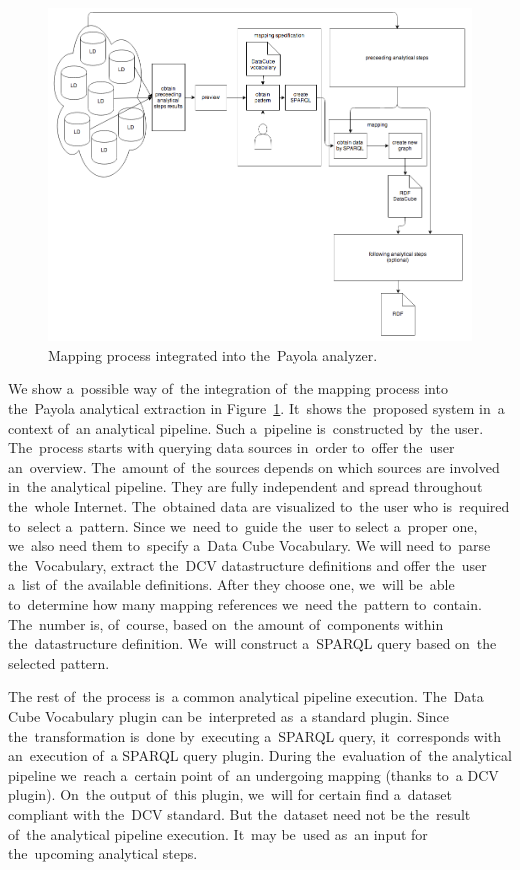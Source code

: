\begin{figure}
	\centering
	\includegraphics[width=140mm]{img/payola-mapping.png}
	\caption{Mapping process integrated into the~Payola analyzer.}
	\label{fig:payola-mapping}
\end{figure}

We show a~possible way of~the integration of~the mapping process into the~Payola analytical extraction
in Figure~\ref{fig:payola-mapping}. It~shows the~proposed system in~a context of~an
analytical pipeline. Such a~pipeline is~constructed by~the user. The~process starts with querying data 
sources in~order to~offer the~user an~overview. The~amount of~the sources depends 
on which sources are involved in~the analytical pipeline. They are fully independent 
and spread throughout the~whole Internet. The~obtained data are visualized to~the user who is~required to~select a~pattern. Since we~need to~guide the~user 
to select a~proper one, we~also need them to~specify a~Data Cube Vocabulary. 
We will need to~parse the~Vocabulary, extract the~DCV datastructure definitions 
and offer the~user a~list of~the available definitions. After they choose one, we~will be~able to~determine how many mapping references we~need the~pattern to~contain. The~number is, of~course, based on~the amount of~components 
within the~datastructure definition. We~will construct a~SPARQL query based on~the selected pattern.

The rest of~the process is~a common analytical pipeline execution. The~Data Cube 
Vocabulary plugin can be~interpreted as~a standard plugin. Since the~transformation is~done by~executing a~SPARQL query, it~corresponds with an~execution of~a SPARQL query plugin. During the~evaluation of~the analytical pipeline we~reach a~certain point of~an undergoing mapping (thanks to~a DCV plugin). On~the output of~this plugin, we~will for certain find a~dataset compliant with the~DCV standard. But the~dataset need not 
be the~result of~the analytical pipeline execution. It~may be~used as~an input 
for the~upcoming analytical steps.


